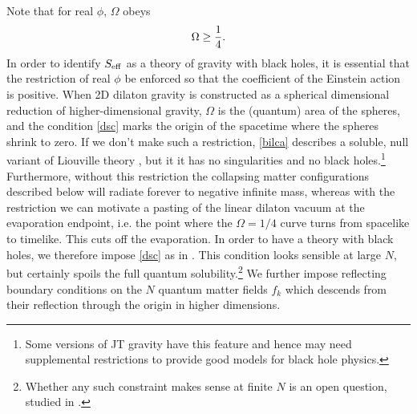 \documentclass[11pt,oneside,letterpaper]{article}
\newcommand{\be}{\begin{equation}}
\newcommand{\ee}{\end{equation}}
\def\be{\begin{eqnarray}}
\def\ee{\end{eqnarray}}
\def\be{\begin{equation}}
\def\ee{\end{equation}}
\numberwithin{equation}{section}
\def \be {\begin{equation}}
\def \ee {\end{equation}}
\begin{document}
Note that for real $\phi$, $\Omega$ obeys \be\label{dsc} \Omega \ge {1 \over 4}.\ee In order to identify $S_{\rm eff}$ as a theory of gravity with black holes, it is essential that the restriction of real $\phi$ be enforced so that the coefficient of the Einstein action is positive.  When 2D dilaton gravity is constructed as  a spherical dimensional reduction of higher-dimensional gravity, $\Omega$ is  the (quantum) area of the spheres, and the condition \eqref{dsc} marks the origin of the spacetime where the spheres shrink to zero.  If we don't make such a restriction, \eqref{bilca} 
describes  a soluble, null variant of Liouville theory   \cite{deAlwis:1992hv,Bilal:1992kv}, but it it has no singularities and no black holes.\footnote{Some versions  of JT gravity have this feature and hence may need supplemental restrictions to provide good models for black hole physics.}  Furthermore, without this restriction the collapsing matter configurations described below will radiate forever to negative infinite mass, whereas with the restriction we can motivate a pasting of the linear dilaton vacuum at the evaporation endpoint, i.e. the point where the $\Omega = 1/4$ curve turns from spacelike to timelike. This cuts off the evaporation. In order  to have a theory with black holes,   we therefore impose \eqref{dsc} as in \cite{Russo:1992ax,Fiola:1994ir}. This condition looks sensible at large $N$, but certainly spoils the full quantum solubility.\footnote{ Whether any such constraint makes sense at finite $N$ is an open question, studied in \cite{Strominger:1994xi,Polchinski:1994zs}.}  We further impose reflecting boundary conditions on the $N$ quantum matter fields $f_k$  which descends from their reflection  through the origin in higher dimensions. 
\end{document}
